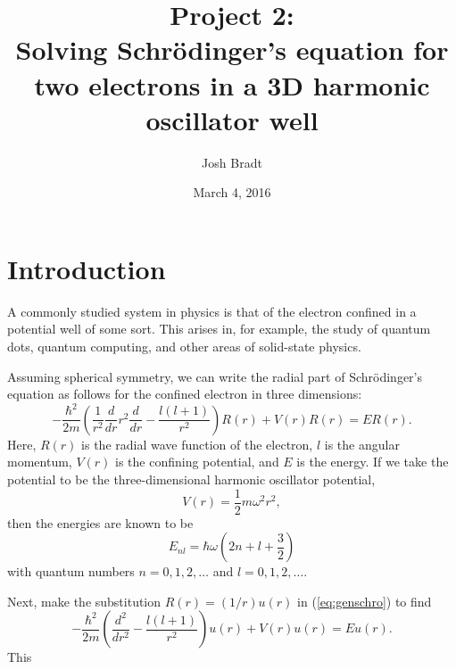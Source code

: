 \documentclass{article}
\title{Project 2:\\Solving Schr\"odinger's equation for two electrons in a 3D harmonic oscillator well}
\author{Josh Bradt}
\date{March 4, 2016}
\begin{document}
\maketitle

\section{Introduction}
    A commonly studied system in physics is that of the electron confined in a potential well of some sort. This arises in, for example, the study of quantum dots, quantum computing, and other areas of solid-state physics.

    Assuming spherical symmetry, we can write the radial part of Schr\"odinger's equation as follows for the confined electron in three dimensions:
    \begin{equation}
        -\frac{\hbar^2}{2m} \left( \frac{1}{r^2} \frac{d}{dr} r^2 \frac{d}{dr} - \frac{l(l+1)}{r^2} \right) R(r) + V(r)R(r) = ER(r).  \label{eq:genschro}
    \end{equation}
    Here, $R(r)$ is the radial wave function of the electron, $l$ is the angular momentum, $V(r)$ is the confining potential, and $E$ is the energy. If we take the potential to be the three-dimensional harmonic oscillator potential,
    \begin{equation}
        V(r) = \frac{1}{2} m \omega^2 r^2,
    \end{equation}
    then the energies are known to be
    \begin{equation}
        E_{nl} = \hbar\omega \left( 2n + l + \frac{3}{2} \right)
    \end{equation}
    with quantum numbers $n=0,1,2,\dots$ and $l=0,1,2,\dots$.

    Next, make the substitution $R(r) = (1/r) u(r)$ in (\ref{eq:genschro}) to find
    \begin{equation*}
        -\frac{\hbar^2}{2m} \left( \frac{d^2}{dr^2} - \frac{l(l+1)}{r^2} \right) u(r) + V(r)u(r) = Eu(r).
    \end{equation*}
    This 
\end{document}
